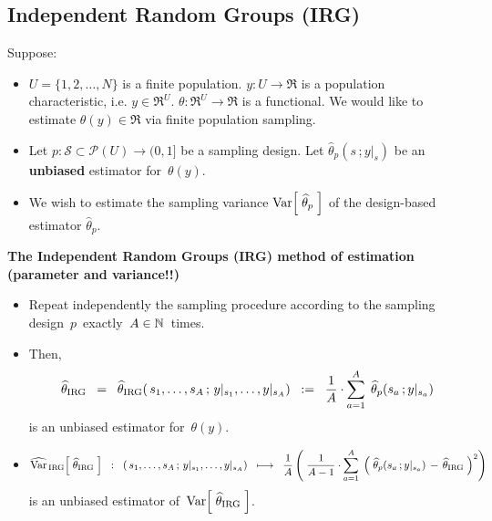 

\subsection{Independent Random Groups (IRG)}

\vskip 0.2cm
Suppose:
\begin{itemize}
\item
	$U = \{1,2,\ldots,N\}$\; is a finite population.
	\;$y : U \longrightarrow \Re$\; is a population characteristic, i.e. \;$y \in \Re^{U}$.\;
	\;$\theta : \Re^{U} \longrightarrow \Re$\; is a functional.
	We would like to estimate \;$\theta(y) \in \Re$\; via finite population sampling.
\item
	Let \;$p : \mathcal{S} \subset \mathcal{P}(U) \longrightarrow (0,1]$\; be a sampling design.
	Let \;$\widehat{\theta}_{p}(s\,;y\vert_{s})$\; be an \textbf{\color{red}unbiased} estimator for \,$\theta(y)$.
\item
	We wish to estimate the sampling variance \;$\textnormal{Var}\!\left[\;\widehat{\theta}_{p}\;\right]$\;
	of the design-based estimator \;$\widehat{\theta}_{p}$.
\end{itemize}

\vskip 0.5cm
\noindent
\textbf{The Independent Random Groups (IRG) method of estimation (parameter and variance!!)}
\begin{itemize}
\item
	Repeat independently the sampling procedure according to the sampling design \,$p$\, exactly \,$A \in \mathbb{N}$\, times.
\item
	Then,
	\begin{equation*}
	\widehat{\theta}_{\textnormal{IRG}}
	\;\; = \;\;
		\widehat{\theta}_{\textnormal{IRG}}(\,s_{1},\ldots,s_{A}\,;\,y\vert_{s_{1}},\ldots,y\vert_{s_{A}})
	\;\; := \;\;
		\dfrac{1}{A}\cdot\overset{A}{\underset{a=1}{\sum}}\;\,\widehat{\theta}_{p}(s_{a}\,;y\vert_{s_{a}})
	\end{equation*}
	is an unbiased estimator for \,$\theta(y)$.
\item
	\begin{equation*}
	\widehat{\textnormal{Var}}_{\,\textnormal{IRG}}\!\left[\;\widehat{\theta}_{\textnormal{IRG}}\;\right]
	\;\; : \;\;
		(\,s_{1},\ldots,s_{A}\,;\,y\vert_{s_{1}},\ldots,y\vert_{s_{A}})
	\;\; \longmapsto \;\;
		\dfrac{1}{A}
		\left(\;
			\dfrac{1}{A-1}\cdot
			\overset{A}{\underset{a=1}{\sum}}\;
			\left(\;\widehat{\theta}_{p}(s_{a}\,;y\vert_{s_{a}}) \,-\, \widehat{\theta}_{\textnormal{IRG}}\;\right)^{2}
			\right)
	\end{equation*}
	is an unbiased estimator of \,$\textnormal{Var}\!\left[\;\widehat{\theta}_{\textnormal{IRG}}\;\right]$.
\end{itemize}

